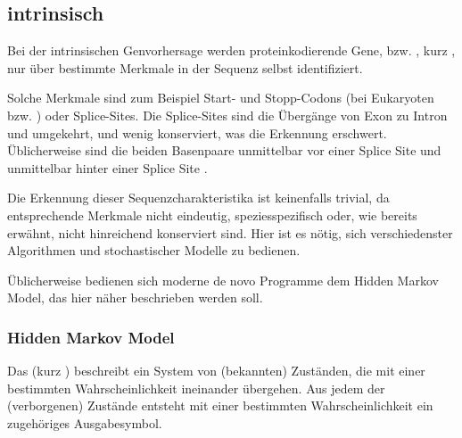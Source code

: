 \subsection{intrinsisch}\label{chp:intrinsisch}
Bei der intrinsischen Genvorhersage werden proteinkodierende Gene, bzw.
, kurz , nur über bestimmte Merkmale in
der Sequenz selbst identifiziert.

Solche Merkmale sind zum Beispiel Start- und Stopp-Codons (bei
Eukaryoten  bzw. ) oder Splice-Sites.
Die Splice-Sites sind die Übergänge von Exon zu Intron und umgekehrt, und wenig
konserviert, was die Erkennung erschwert.
Üblicherweise sind die beiden Basenpaare unmittelbar vor einer
Splice Site  und unmittelbar hinter einer Splice Site .

Die Erkennung dieser Sequenzcharakteristika ist keinenfalls trivial, da entsprechende
Merkmale nicht eindeutig, speziesspezifisch oder, wie bereits erwähnt, nicht
hinreichend konserviert sind.
Hier ist es nötig, sich verschiedenster Algorithmen und stochastischer
Modelle zu bedienen.

Üblicherweise bedienen sich moderne de novo  Programme dem Hidden
Markov Model, das hier näher beschrieben werden soll.

\subsubsection{Hidden Markov Model}\label{chp:hmm}
Das  (kurz )
beschreibt ein System von (bekannten) Zuständen, die mit einer bestimmten
Wahrscheinlichkeit ineinander übergehen.
Aus jedem der (verborgenen) Zustände entsteht mit einer
bestimmten Wahrscheinlichkeit ein zugehöriges Ausgabesymbol.

